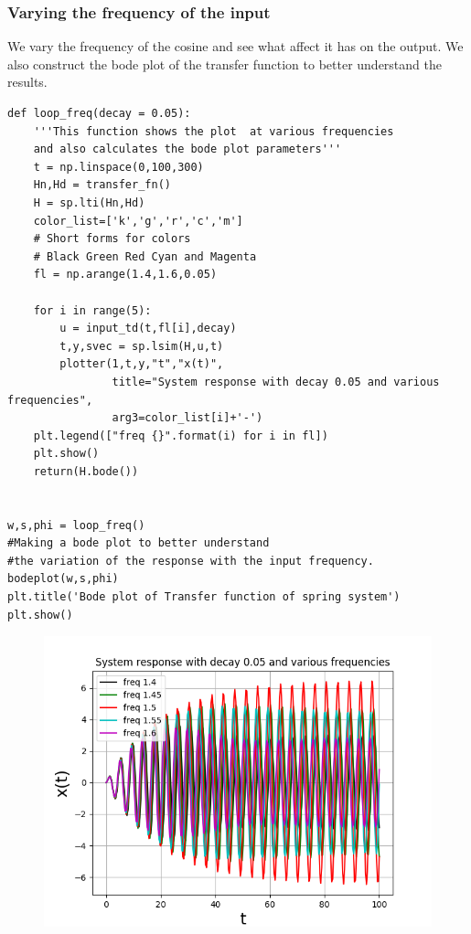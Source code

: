 \documentclass[11pt, a4paper]{article}
\begin{document}
\subsubsection{Varying the frequency of the input}
{
We vary the frequency of the cosine  and see what affect it has on the output.
We also construct the bode plot of the transfer function to better understand the results. 
}
\begin{verbatim}
def loop_freq(decay = 0.05):
    '''This function shows the plot  at various frequencies
    and also calculates the bode plot parameters'''
    t = np.linspace(0,100,300)
    Hn,Hd = transfer_fn()
    H = sp.lti(Hn,Hd)
    color_list=['k','g','r','c','m']
    # Short forms for colors
    # Black Green Red Cyan and Magenta
    fl = np.arange(1.4,1.6,0.05)
    
    for i in range(5):
        u = input_td(t,fl[i],decay)
        t,y,svec = sp.lsim(H,u,t)
        plotter(1,t,y,"t","x(t)",
                title="System response with decay 0.05 and various frequencies",
                arg3=color_list[i]+'-')
    plt.legend(["freq {}".format(i) for i in fl])
    plt.show()
    return(H.bode())


w,s,phi = loop_freq()
#Making a bode plot to better understand 
#the variation of the response with the input frequency.
bodeplot(w,s,phi)
plt.title('Bode plot of Transfer function of spring system')
plt.show()

\end{verbatim}
\begin{figure}[!tbh]
   	\centering
   	\includegraphics[scale=0.5]{img3.png}
   	\label{fig:32}
   \end{figure}
\end{document}
